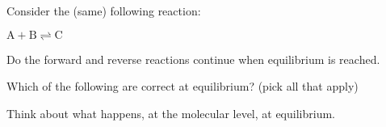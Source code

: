 \documentclass{ximera}
\begin{document}
\begin{question}
Consider the (same) following reaction:

$\mathrm{A+B \rightleftharpoons C}$


Do the forward and reverse reactions continue when equilibrium is reached.

 \begin{multipleChoice}
\end{multipleChoice}
\end{question}

\begin{question}
Which of the following are correct at equilibrium? (pick all that apply)
%
\begin{selectAll}
\begin{hint}
Think about what happens, at the molecular level, at equilibrium.
\end{hint}
 \end{selectAll}
\end{question}
\end{document}

